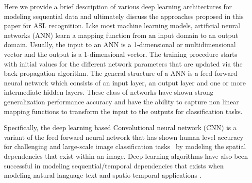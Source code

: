 \documentclass[10pt,twocolumn,letterpaper]{article}
\begin{document}
Here we provide a brief description of various 
deep learning architectures for modeling sequential data and ultimately discuss 
the approaches proposed in this paper for ASL recognition. 
%
Like most  machine learning models,  artificial neural networks (ANN)
learn a mapping function from an input domain to an 
output domain. Usually, the 
input to an ANN is a 1-dimensional 
or multidimensional vector and the 
output is a 1-dimensional 
vector. The training procedure starts 
with initial values for the different 
network parameters that are updated via the 
back propagation algorithm. 
The general structure of a ANN is 
a feed forward neural network which consists of an input layer, an output layer and one or more intermediate hidden layers.  These class of 
networks have shown 
strong generalization 
performance accuracy and have the ability to capture 
non linear mapping functions to transform the input to the outputs for classification tasks. 


Specifically, the deep learning based 
Convolutional neural network (CNN)  is  a  variant of the 
feed forward neural network that 
has shown human level accuracy for challenging and large-scale 
image classification tasks~\cite{NIPS2012_4824} by modeling the spatial dependencies that exist within an image. Deep 
learning algorithms have also been successful in modeling sequential/temporal 
dependencies that exists when modeling natural language text \cite{DBLP:journals/corr/Graves13,DBLP:journals/corr/SutskeverVL14,DBLP:journals/corr/BahdanauCB14} and spatio-temporal applications \cite{DBLP:journals/corr/abs-0705-2011}. 
\end{document}
